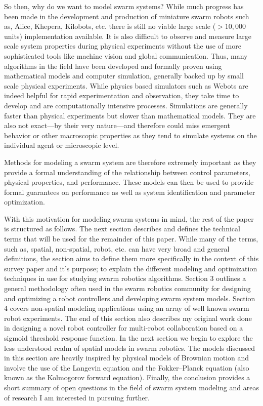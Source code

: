 \documentclass[Main.tex]{subfiles}
\begin{document}
So then, why do we want to model swarm systems? While much progress has been made in the development and production of miniature swarm robots such as, Alice, Khepera, Kilobots, etc.\cite{Dorigo2005, Seyfried2005, Mondada2009, Caprari1998, Rubenstein2012} there is still no viable large scale ($> 10,000$ units) implementation available. It is also difficult to observe and measure large scale system properties during physical experiments without the use of more sophisticated tools like machine vision and global communication. Thus, many algorithms in the field have been developed and formally proven using mathematical models and computer simulation, generally backed up by small scale physical experiments. While physics based simulators such as Webots\cite{Michel1998} are indeed helpful for rapid experimentation and observation, they take time to develop and are computationally intensive processes. Simulations are generally faster than physical experiments but slower than mathematical models. They are also not exact---by their very nature---and therefore could miss emergent behavior or other macroscopic properties as they tend to simulate systems on the individual agent or microscopic level. 

Methods for modeling a swarm system are therefore extremely important as they provide a formal understanding of the relationship between control parameters, physical properties, and performance. These models can then be used to provide formal guarantees on performance as well as system identification and parameter optimization\cite{Correll2006a, Correll2008}.

With this motivation for modeling swarm systems in mind, the rest of the paper is structured as follows. The next section describes and defines the technical terms that will be used for the remainder of this paper. While many of the terms, such as, spatial, non-spatial, robot, etc. can have very broad and general definitions, the section aims to define them more specifically in the context of this survey paper and it's purpose; to explain the different modeling and optimization techniques in use for studying swarm robotics algorithms. Section 3 outlines a general methodology often used in the swarm robotics community for designing and optimizing a robot controllers and developing swarm system models. Section 4 covers non-spatial modeling applications using an array of well known swarm robot experiments. The end of this section also describes my original work done in designing a novel robot controller for multi-robot collaboration based on a sigmoid threshold response function. In the next section we begin to explore the less understood realm of spatial models in swarm robotics. The models discussed in this section are heavily inspired by physical models of Brownian motion and involve the use of the Langevin equation and the Fokker--Planck equation (also known as the Kolmogorov forward equation). Finally, the conclusion provides a short summary of open questions in the field of swarm system modeling and areas of research I am interested in pursuing further.
\end{document}
